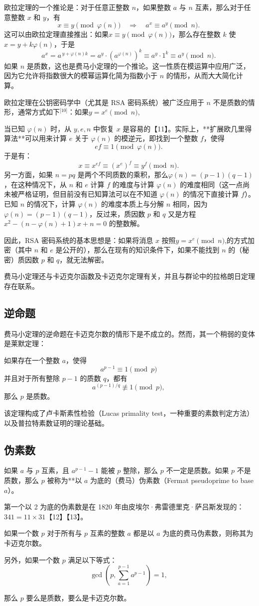 欧拉定理的一个推论是：对于任意正整数 $n$，如果整数 $a$ 与 $n$ 互素，那么对于任意整数 $x$ 和 $y$，有
$$
x \equiv y \pmod{\varphi(n)} \quad \Rightarrow \quad a^x \equiv a^y \pmod{n}.~
$$
这可以由欧拉定理直接推出：如果$x \equiv y \pmod{\varphi(n)}$，那么存在整数 $k$ 使 $x = y + k\varphi(n)$，于是
$$
a^x = a^{\,y + \varphi(n)k} = a^y \cdot \left(a^{\varphi(n)}\right)^k \equiv a^y \cdot 1^k \equiv a^y \pmod{n}.~
$$
如果 $n$ 是质数，这也是费马小定理的一个推论。这一性质在模运算中应用广泛，因为它允许将指数很大的模幂运算化简为指数小于 $n$ 的情形，从而大大简化计算。

欧拉定理在公钥密码学中（尤其是 RSA 密码系统）被广泛应用于 $n$ 不是质数的情形，通常方式如下\(^\text{[10]}\)：如果$y = x^e \pmod{n}$,

当已知 $\varphi(n)$ 时，从 $y, e, n$ 中恢复 $x$ 是容易的【11】。实际上，**扩展欧几里得算法**可以用来计算 $e$ 关于 $\varphi(n)$ 的模逆元，即找到一个整数 $f$，使得
$$
ef \equiv 1 \pmod{\varphi(n)}.~
$$
于是有：
$$
x \equiv x^{ef} \equiv (x^e)^f \equiv y^f \pmod{n}.~
$$
另一方面，如果 $n = pq$ 是两个不同质数的乘积，那么$\varphi(n) = (p - 1)(q - 1)$，在这种情况下，从 $n$ 和 $e$ 计算 $f$ 的难度与计算 $\varphi(n)$ 的难度相同（这一点尚未被严格证明，但目前没有已知算法可以在不知道 $\varphi(n)$ 的情况下直接计算 $f$）。已知 $n$ 的情况下，计算 $\varphi(n)$ 的难度本质上与分解 $n$ 相同，因为$\varphi(n) = (p - 1)(q - 1)$，反过来，质因数 $p$ 和 $q$ 又是方程$x^2 - (n - \varphi(n) + 1)x + n = 0$
的整数解。

因此，RSA 密码系统的基本思想是：如果将消息 $x$ 按照$y = x^e \pmod{n}$,的方式加密（其中 $n$ 和 $e$ 是公开的），那么在现有的知识条件下，如果不能找到 $n$ 的（秘密）质因数 $p$ 和 $q$，就无法解密。

费马小定理还与卡迈克尔函数及卡迈克尔定理有关，并且与群论中的拉格朗日定理存在联系。
\subsection{逆命题}
费马小定理的逆命题在卡迈克尔数的情形下是不成立的。然而，其一个稍弱的变体是莱默定理：

如果存在一个整数 $a$，使得
$$
a^{p-1} \equiv 1 \pmod{p}~
$$
并且对于所有整除 $p - 1$ 的质数 $q$，都有
$$
a^{(p-1)/q} \not\equiv 1 \pmod{p},~
$$
那么 $p$ 是质数。

该定理构成了卢卡斯素性检验（Lucas primality test，一种重要的素数判定方法）以及普拉特素数证明的理论基础。
\subsection{伪素数}
如果 $a$ 与 $p$ 互素，且 $a^{p-1} - 1$ 能被 $p$ 整除，那么 $p$ 不一定是质数。如果 $p$ 不是质数，那么 $p$ 被称为**以 $a$ 为底的（费马）伪素数（Fermat pseudoprime to base $a$）。

第一个以 2 为底的伪素数是在 1820 年由皮埃尔·弗雷德里克·萨吕斯发现的：$341 = 11 \times 31$【12】【13】。  

如果一个数 \( p \) 对于所有与 \( p \) 互素的整数 \( a \) 都是以 \( a \) 为底的费马伪素数，则称其为卡迈克尔数。  

另外，如果一个数 \( p \) 满足以下等式：  
$$
\gcd\left(p, \sum_{a=1}^{p-1} a^{p-1}\right) = 1,~
$$

那么 $p$ 要么是质数，要么是卡迈克尔数。
